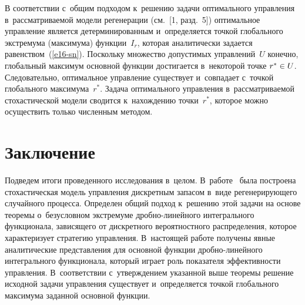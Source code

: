 \begin{multicols}{2}
  В соответствии с~общим подходом к~решению задачи оптимального 
управ\-ле\-ния в~рас\-смат\-ри\-ва\-емой модели регенерации (см.~[1,  разд.~5]) 
оптимальное управление является детерминированным и~определяется точ\-кой 
глобального экстремума (максимума) функции~$I_r$, которая аналитически 
задается равенством~(\ref{e16-sn}). Поскольку множество допустимых 
управ\-ле\-ний~$U$ конечно, глобальный максимум основной функции 
достигается в~некоторой точке $r^*\hm\in U$. Следовательно, оптимальное 
управление существует и~совпадает с~точ\-кой глобального максимума~$r^*$. 
Задача оптимального управ\-ле\-ния в~рас\-смат\-ри\-ва\-емой стохастической модели 
сводится к~на\-хож\-де\-нию точ\-ки~$r^*$, которое можно осуществить только 
чис\-лен\-ным методом.

  \vspace*{-6pt}

\section{Заключение}

  Подведем итоги проведенного исследования в~целом. В~работе~\cite{1-sn} 
была по\-стро\-ена стохастическая модель управ\-ле\-ния дискретным запасом в~виде 
регенерирующего случайного процесса. Определен общий подход к~решению 
этой задачи на основе тео\-ре\-мы о~без\-услов\-ном экстремуме  
дроб\-но-ли\-ней\-но\-го интегрального функционала, зависящего от 
дискретного вероятностного распределения, которое характеризует стратегию 
управ\-ле\-ния. В~на\-сто\-ящей работе получены явные аналитические 
пред\-став\-ле\-ния для основной функции дроб\-но-ли\-ней\-но\-го интегрального 
функционала, который играет роль показателя эффективности управ\-ле\-ния. 
В~соответствии с~утверж\-де\-ни\-ем указанной выше тео\-ре\-мы решение исходной 
задачи управ\-ле\-ния существует и~определяется точ\-кой глобального максимума 
заданной основной функции.


\end{multicols}
